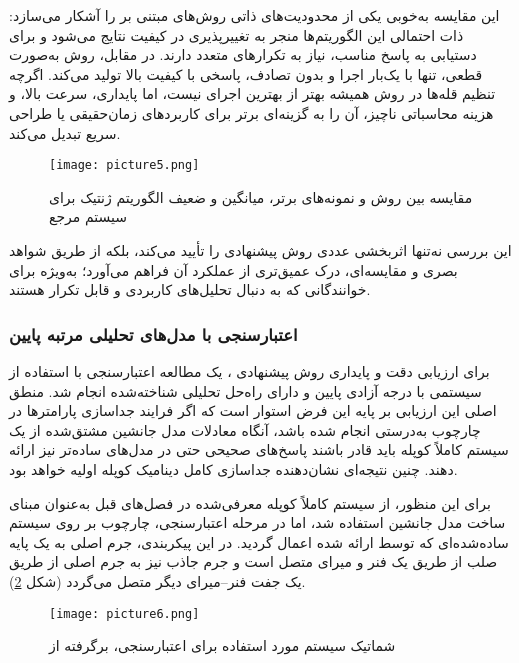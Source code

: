این مقایسه به‌خوبی یکی از محدودیت‌های ذاتی روش‌های مبتنی بر  را آشکار می‌سازد: ذات احتمالی این الگوریتم‌ها منجر به تغییرپذیری در کیفیت نتایج می‌شود و برای دستیابی به پاسخ مناسب، نیاز به تکرارهای متعدد دارند. در مقابل، روش  به‌صورت قطعی، تنها با یک‌بار اجرا و بدون تصادف، پاسخی با کیفیت بالا تولید می‌کند. اگرچه تنظیم قله‌ها در روش  همیشه بهتر از بهترین اجرای  نیست، اما پایداری، سرعت بالا، و هزینه محاسباتی ناچیز، آن را به گزینه‌ای برتر برای کاربردهای زمان‌حقیقی یا طراحی سریع تبدیل می‌کند.

\begin{figure}[H]
    \centering
    \texttt{[image: picture5.png]}
    \caption{مقایسه  بین روش  و نمونه‌های برتر، میانگین و ضعیف الگوریتم ژنتیک برای سیستم مرجع}
    \label{fig:frf-dps-vs-ga}
\end{figure}

این بررسی نه‌تنها اثربخشی عددی روش پیشنهادی را تأیید می‌کند، بلکه از طریق شواهد بصری و مقایسه‌ای، درک عمیق‌تری از عملکرد آن فراهم می‌آورد؛ به‌ویژه برای خوانندگانی که به دنبال تحلیل‌های کاربردی و قابل تکرار هستند.



\subsubsection{اعتبارسنجی با مدل‌های تحلیلی مرتبه پایین}

برای ارزیابی دقت و پایداری روش پیشنهادی ، یک مطالعه اعتبارسنجی با استفاده از سیستمی با درجه آزادی پایین و دارای راه‌حل تحلیلی شناخته‌شده انجام شد. منطق اصلی این ارزیابی بر پایه این فرض استوار است که اگر فرایند جداسازی پارامترها در چارچوب  به‌درستی انجام شده باشد، آنگاه معادلات مدل جانشین مشتق‌شده از یک سیستم کاملاً کوپله باید قادر باشند پاسخ‌های صحیحی حتی در مدل‌های ساده‌تر نیز ارائه دهند. چنین نتیجه‌ای نشان‌دهنده جداسازی کامل دینامیک کوپله اولیه خواهد بود.

برای این منظور، از سیستم  کاملاً کوپله معرفی‌شده در فصل‌های قبل به‌عنوان مبنای ساخت مدل جانشین استفاده شد، اما در مرحله اعتبارسنجی، چارچوب  بر روی سیستم ساده‌شده‌ای که توسط  \cite{asami2002analytical} ارائه شده اعمال گردید. در این پیکربندی، جرم اصلی به یک پایه صلب از طریق یک فنر و میرای متصل است و جرم جاذب نیز به جرم اصلی از طریق یک جفت فنر–میرای دیگر متصل می‌گردد (شکل \ref{fig:asami-validation-diagram}).

\begin{figure}[h]
\centering
\texttt{[image: picture6.png]}
\caption{شماتیک سیستم مورد استفاده برای اعتبارسنجی، برگرفته از  \cite{asami2002analytical}}
\label{fig:asami-validation-diagram}
\end{figure}

